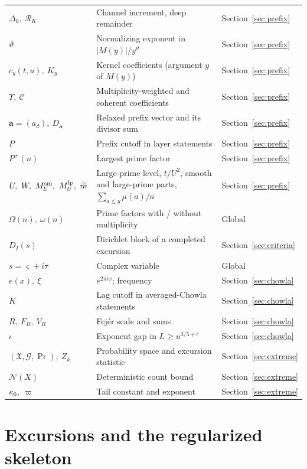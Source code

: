 \documentclass[11pt]{amsart}
\numberwithin{equation}{section}
\theoremstyle{plain}
\theoremstyle{definition}
\theoremstyle{remark}
\newcommand{\Pp}{P^{+}}
\newcommand{\Cc}{\mathcal{C}}
\newcommand{\mt}{\widetilde{m}}
\begin{document}
\begin{longtable}{@{}p{}p{}p{}@{}}
$\Delta_k,\ \mathcal R_K$ & Channel increment, deep remainder & Section~\ref{sec:prefix}\\
$\vartheta$ & Normalizing exponent in $|M(y)|/y^\vartheta$ & Section~\ref{sec:prefix}\\
$c_y(t,u),\ K_y$ & Kernel coefficients (argument $y$ of $M(y)$) & Section~\ref{sec:prefix}\\
$\Upsilon,\ \Cc$ & Multiplicity-weighted and coherent coefficients & Section~\ref{sec:prefix}\\
$\mathbf a=(a_d),\ D_{\mathbf a}$ & Relaxed prefix vector and its divisor sum & Section~\ref{sec:prefix}\\
$P$ & Prefix cutoff in layer statements & Section~\ref{sec:prefix}\\
$\Pp(n)$ & Largest prime factor & Section~\ref{sec:prefix}\\
$U,\ W,\ M^{\rm sm}_U,\ M^{\rm lp}_U,\ \mt$ & Large-prime level, $t/U^2$, smooth and large-prime parts, $\sum_{a\le y}\mu(a)/a$ & Section~\ref{sec:prefix}\\
$\Omega(n),\ \omega(n)$ & Prime factors with / without multiplicity & Global\\
$D_I(s)$ & Dirichlet block of a completed excursion & Section~\ref{sec:criteria}\\
$s=\varsigma+i\tau$ & Complex variable & Global\\
$e(x),\ \xi$ & $e^{2\pi ix}$; frequency & Section~\ref{sec:chowla}\\
$K$ & Lag cutoff in averaged-Chowla statements & Section~\ref{sec:chowla}\\
$R,\ F_R,\ V_R$ & Fejér scale and sums & Section~\ref{sec:chowla}\\
$\iota$ & Exponent gap in $L\ge u^{3/5+\iota}$ & Section~\ref{sec:chowla}\\
$(\mathfrak X,\mathcal G,\Pr),\ Z_k$ & Probability space and excursion statistic & Section~\ref{sec:extreme}\\
$\mathcal N(X)$ & Deterministic count bound & Section~\ref{sec:extreme}\\
$\kappa_0,\ \varpi$ & Tail constant and exponent & Section~\ref{sec:extreme}\\
\bottomrule
\end{longtable}
\normalsize

\section{Excursions and the regularized skeleton}
\label{sec:definitions}
\end{document}
